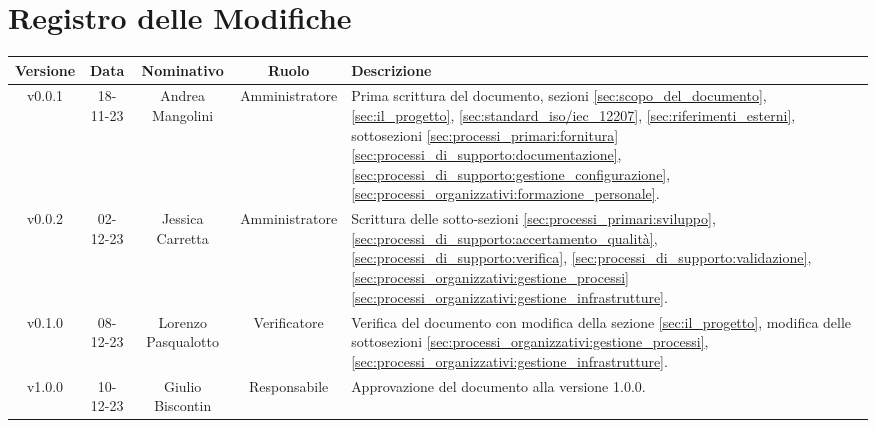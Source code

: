 \section*{\Large Registro delle Modifiche}
    \begin{table}[h]
        \centering
        \renewcommand\tabularxcolumn[1]{m{#1}} %
        \renewcommand{\arraystretch}{1.5}
        \begin{tabularx}{0.98\textwidth}
            {c|c|c|c|>{\centering\arraybackslash}X}
            \rowcolor{black}
            \textbf{\color{white} Versione} & \textbf{\color{white} Data} & \textbf{\color{white} Nominativo} & \textbf{\color{white} Ruolo} & \textbf{\color{white} Descrizione} \\ 
            \hline

            v0.0.1 & 18-11-23 & Andrea Mangolini & Amministratore & Prima scrittura del documento, sezioni \ref{sec:scopo_del_documento}, \ref{sec:il_progetto}, \ref{sec:standard_iso/iec_12207}, \ref{sec:riferimenti_esterni}, sottosezioni \ref{sec:processi_primari:fornitura} \ref{sec:processi_di_supporto:documentazione}, \ref{sec:processi_di_supporto:gestione_configurazione}, \ref{sec:processi_organizzativi:formazione_personale}. \\

            v0.0.2 & 02-12-23 & Jessica Carretta & Amministratore & Scrittura delle sotto-sezioni \ref{sec:processi_primari:sviluppo}, \ref{sec:processi_di_supporto:accertamento_qualità}, \ref{sec:processi_di_supporto:verifica}, \ref{sec:processi_di_supporto:validazione}, \ref{sec:processi_organizzativi:gestione_processi}\ref{sec:processi_organizzativi:gestione_infrastrutture}. \\

            v0.1.0 & 08-12-23 & Lorenzo Pasqualotto & Verificatore & 
            Verifica del documento con modifica della sezione \ref{sec:il_progetto}, modifica delle sottosezioni
            \ref{sec:processi_organizzativi:gestione_processi},
            \ref{sec:processi_organizzativi:gestione_infrastrutture}.\\

            v1.0.0 & 10-12-23 & Giulio Biscontin & Responsabile & 
            Approvazione del documento alla versione 1.0.0. \\


\end{tabularx}
\end{table}
